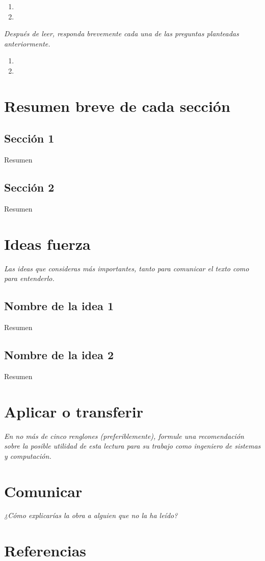 \documentclass[11pt,letterpaper]{article}
\begin{document}
\begin{enumerate}
	\item 
	\item
\end{enumerate}

\textit{Después de leer, responda brevemente cada una de las preguntas planteadas anteriormente.}

\begin{enumerate}
	\item 
	\item
\end{enumerate}

\section{Resumen breve de cada sección}
\subsection{Sección 1}
Resumen

\subsection{Sección 2}
Resumen

\section{Ideas fuerza}
\textit{Las ideas que consideras más importantes, tanto para comunicar el texto como para entenderlo.}

\subsection{Nombre de la idea 1}
Resumen

\subsection{Nombre de la idea 2}
Resumen

\section{Aplicar o transferir}
\textit{En no más de cinco renglones (preferiblemente), formule una recomendación sobre la posible utilidad de esta lectura para su trabajo como ingeniero de sistemas y computación.}

\section{Comunicar}
\textit{¿Cómo explicarías la obra a alguien que no la ha leído?}

\section{Referencias}
\end{document}
